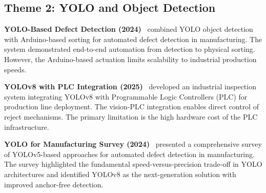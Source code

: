 \documentclass{ieeeaccess}
\begin{document}
\begin{table}[!t]
\caption{Summary of CNN and Transfer Learning Studies}
\label{tab:cnn}
\centering
\small
{}
\end{table}


\subsection{Theme 2: YOLO and Object Detection}

\textbf{YOLO-Based Defect Detection (2024)}~\cite{defectdetection2024} combined YOLO object detection with Arduino-based sorting for automated defect detection in manufacturing. The system demonstrated end-to-end automation from detection to physical sorting. However, the Arduino-based actuation limits scalability to industrial production speeds.

\textbf{YOLOv8 with PLC Integration (2025)}~\cite{industrialsystem2025} developed an industrial inspection system integrating YOLOv8 with Programmable Logic Controllers (PLC) for production line deployment. The vision-PLC integration enables direct control of reject mechanisms. The primary limitation is the high hardware cost of the PLC infrastructure.

\textbf{YOLO for Manufacturing Survey (2024)}~\cite{ijisrt2024} presented a comprehensive survey of YOLOv5-based approaches for automated defect detection in manufacturing. The survey highlighted the fundamental speed-versus-precision trade-off in YOLO architectures and identified YOLOv8 as the next-generation solution with improved anchor-free detection.
\end{document}
